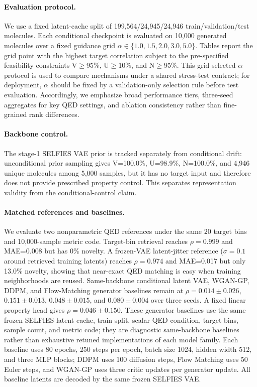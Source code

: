 \documentclass[letterpaper]{article}
\begin{document}
\paragraph{Evaluation protocol.}
We use a fixed latent-cache split of 199,564/24,945/24,946
train/validation/test molecules. Each conditional checkpoint is evaluated on
10,000 generated molecules over a fixed guidance grid
$\alpha\in\{1.0,1.5,2.0,3.0,5.0\}$. Tables report the grid
point with the highest target correlation subject to the pre-specified
feasibility constraints
V$\ge$95\%, U$\ge$10\%, and N$\ge$95\%.
This grid-selected $\alpha$ protocol is used to compare mechanisms under a
shared stress-test contract; for deployment, $\alpha$ should be fixed by a
validation-only selection rule before test evaluation.
Accordingly, we emphasize broad performance tiers, three-seed aggregates for
key QED settings, and ablation consistency rather than fine-grained rank
differences.

\paragraph{Backbone control.}
The stage-1 SELFIES VAE prior is tracked separately from conditional drift:
unconditional prior sampling gives V=100.0\%, U=98.9\%, N=100.0\%, and 4,946
unique molecules among 5,000 samples, but it has no target input and therefore
does not provide prescribed property control. This separates representation
validity from the conditional-control claim.

\paragraph{Matched references and baselines.}
We evaluate two nonparametric QED references under the same 20 target bins and
10,000-sample metric code. Target-bin retrieval reaches $\rho=0.999$ and
MAE=0.008 but has 0\% novelty. A frozen-VAE latent-jitter reference
($\sigma=0.1$ around retrieved training latents) reaches $\rho=0.974$ and
MAE=0.017 but only 13.0\% novelty, showing that near-exact QED matching is easy
when training neighborhoods are reused. Same-backbone conditional latent VAE,
WGAN-GP, DDPM, and Flow-Matching generator baselines remain at
$\rho=0.014\pm0.026$, $0.151\pm0.013$, $0.048\pm0.015$, and
$0.080\pm0.004$ over three seeds. A fixed linear property head gives
$\rho=0.046\pm0.150$. These generator baselines use the same frozen SELFIES
latent cache, train split, scalar QED condition, target bins, sample count, and
metric code; they are diagnostic same-backbone baselines rather than exhaustive
retuned implementations of each model family. Each baseline uses 80 epochs,
250 steps per epoch, batch size 1024, hidden width 512, and three MLP blocks;
DDPM uses 100 diffusion steps, Flow Matching uses 50 Euler steps, and WGAN-GP
uses three critic updates per generator update. All baseline latents are
decoded by the same frozen SELFIES VAE.
\end{document}
